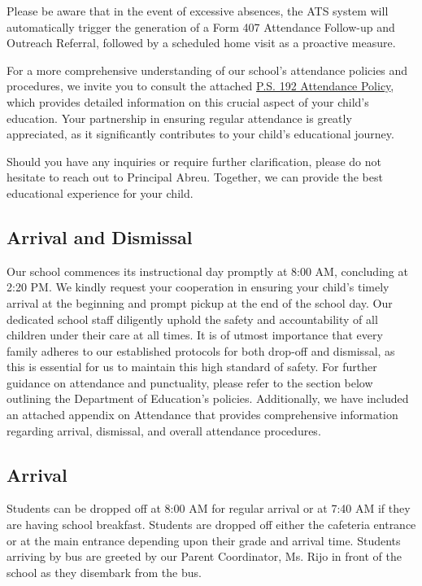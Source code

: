 \documentclass[11pt, letterpaper]{article}
\begin{document}
Please be aware that in the event of excessive absences, the ATS system will automatically trigger the generation of a Form 407 Attendance Follow-up and Outreach Referral, followed by a scheduled home visit as a proactive measure.

For a more comprehensive understanding of our school's attendance policies and procedures, we invite you to consult the attached \hyperref[firstappendix]{P.S. 192 Attendance Policy}, which provides detailed information on this crucial aspect of your child's education. Your partnership in ensuring regular attendance is greatly appreciated, as it significantly contributes to your child's educational journey.

Should you have any inquiries or require further clarification, please do not hesitate to reach out to Principal Abreu. Together, we can provide the best educational experience for your child. 

\subsection{Arrival and Dismissal}
Our school commences its instructional day promptly at 8:00 AM, concluding at 2:20 PM. We kindly request your cooperation in ensuring your child's timely arrival at the beginning and prompt pickup at the end of the school day. Our dedicated school staff diligently uphold the safety and accountability of all children under their care at all times. It is of utmost importance that every family adheres to our established protocols for both drop-off and dismissal, as this is essential for us to maintain this high standard of safety. For further guidance on attendance and punctuality, please refer to the section below outlining the Department of Education's policies. Additionally, we have included an attached appendix on Attendance that provides comprehensive information regarding arrival, dismissal, and overall attendance procedures.

\subsection{Arrival}
Students can be dropped off at 8:00 AM for regular arrival or at 7:40 AM if they are having school breakfast. Students are dropped off either the cafeteria entrance or at the main entrance depending upon their grade and arrival time. Students arriving by bus are greeted by our Parent Coordinator, Ms. Rijo in front of the school as they disembark from the bus.
\end{document}
